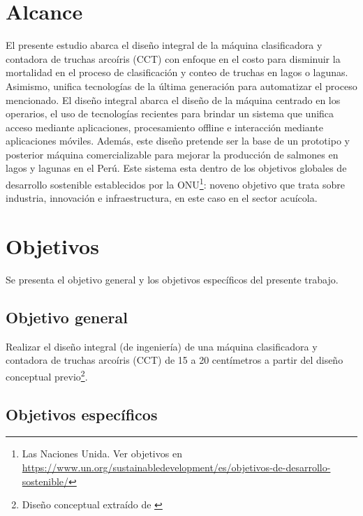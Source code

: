 \section{Alcance}

El presente estudio abarca el diseño integral de la máquina clasificadora y contadora de truchas arcoíris (CCT) con enfoque en el costo para disminuir la mortalidad en el proceso de clasificación y conteo de truchas en lagos o lagunas. Asimismo, unifica tecnologías de la última generación para automatizar el proceso mencionado. El diseño integral abarca el diseño de la máquina centrado en los operarios, el uso de tecnologías recientes para brindar un sistema que unifica acceso mediante aplicaciones, procesamiento offline e interacción mediante aplicaciones móviles. Además, este diseño pretende ser la base de un prototipo y posterior máquina comercializable para mejorar la producción de salmones en lagos y lagunas en el Perú. Este sistema esta dentro de los objetivos globales de desarrollo sostenible establecidos por la ONU\footnote{Las Naciones Unida. Ver objetivos en \href{https://www.un.org/sustainabledevelopment/es/objetivos-de-desarrollo-sostenible/}{https://www.un.org/sustainabledevelopment/es/objetivos-de-desarrollo-sostenible/}}: noveno objetivo que trata sobre industria, innovación e infraestructura, en este caso en el sector acuícola.

\section{Objetivos}

Se presenta el objetivo general y los objetivos específicos del presente trabajo.

\subsection{Objetivo general}

Realizar el diseño integral (de ingeniería) de una máquina clasificadora y contadora de truchas arcoíris (CCT) de 15 a 20 centímetros a partir del diseño conceptual previo\footnote{Diseño conceptual extraído de \cite{DiazVergara2020}}.

\subsection{Objetivos específicos}

